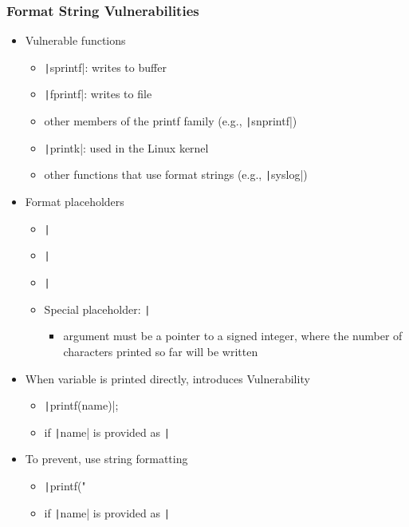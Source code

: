\documentclass[final]{article}
\begin{document}
\subsubsection*{Format String Vulnerabilities}
\begin{itemize}
    \item Vulnerable functions
          \begin{itemize}[nosep]
              \item \texttt|sprintf|: writes to buffer
              \item \texttt|fprintf|: writes to file
              \item other members of the printf family (e.g., \texttt|snprintf|)
              \item \texttt|printk|: used in the Linux kernel
              \item other functions that use format strings (e.g., \texttt|syslog|)
          \end{itemize}
    \item Format placeholders
          \begin{itemize}[nosep]
              \item \texttt|%
              \item \texttt|%
              \item \texttt|%
              \item Special placeholder: \texttt|%
                    \begin{itemize}[nosep]
                        \item argument must be a pointer to a signed integer, where the number of characters printed so far will be written
                    \end{itemize}
          \end{itemize}
    \item When variable is printed directly, introduces Vulnerability
          \begin{itemize}[nosep]
              \item \texttt|printf(name)|;
              \item if \texttt|name| is provided as \texttt|%
          \end{itemize}
    \item To prevent, use string formatting
          \begin{itemize}[nosep]
              \item \texttt|printf("%
              \item if \texttt|name| is provided as \texttt|%
          \end{itemize}
\end{itemize}
\end{document}
